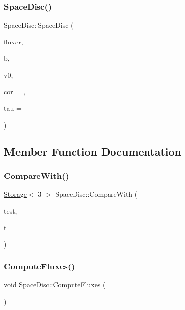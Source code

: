\subsubsection{\texorpdfstring{Space\+Disc()}{SpaceDisc()}\hspace{0.1cm}{\footnotesize\ttfamily [2/2]}}
{\footnotesize\ttfamily Space\+Disc\+::\+Space\+Disc (\begin{DoxyParamCaption}\item[{const \hyperlink{structSpaceDisc_a96fbebf5dd4659e2dcc144a5debc861d}{Fluxer} \&}]{fluxer,  }\item[{\hyperlink{structBathymetry}{Bathymetry} \&\&}]{b,  }\item[{\hyperlink{ValueField_8h_a329043a10c46a8722ea79ba24fe40f97}{Volume\+Field} \&\&}]{v0,  }\item[{double}]{cor = {},  }\item[{double}]{tau = {} }\end{DoxyParamCaption})}



\subsection{Member Function Documentation}
\mbox{\label{structSpaceDisc_adeaf3b111301eb2d4fa845ce89aca9c7}} 
\subsubsection{\texorpdfstring{Compare\+With()}{CompareWith()}}
{\footnotesize\ttfamily \hyperlink{Includes_8h_ae7d375db701e28425a3faea2827f134b}{Storage}$<$ 3 $>$ Space\+Disc\+::\+Compare\+With (\begin{DoxyParamCaption}\item[{const \hyperlink{classTest}{Test} \&}]{test,  }\item[{double}]{t }\end{DoxyParamCaption})}

\mbox{\label{structSpaceDisc_a24d17843bb599b8359e17e647ecb3819}} 
\subsubsection{\texorpdfstring{Compute\+Fluxes()}{ComputeFluxes()}}
{\footnotesize\ttfamily void Space\+Disc\+::\+Compute\+Fluxes (\begin{DoxyParamCaption}{ }\end{DoxyParamCaption})}

